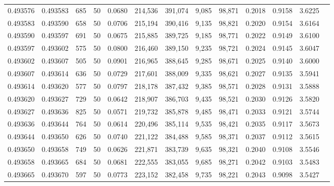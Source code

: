 \begin{tabular}{rrrrrrrrrrrrr}
0.493576 & 0.493583 &   685 &  50 &                                     0.0680 & 214,536 & 391,074 &   9,085 &  98,871 & 0.2018 & 0.9158 & 3.6225 \\
0.493583 & 0.493590 &   658 &  50 &                                     0.0706 & 215,194 & 390,416 &   9,135 &  98,821 & 0.2020 & 0.9154 & 3.6164 \\
0.493590 & 0.493597 &   691 &  50 &                                     0.0675 & 215,885 & 389,725 &   9,185 &  98,771 & 0.2022 & 0.9149 & 3.6100 \\
0.493597 & 0.493602 &   575 &  50 &                                     0.0800 & 216,460 & 389,150 &   9,235 &  98,721 & 0.2024 & 0.9145 & 3.6047 \\
0.493602 & 0.493607 &   505 &  50 &                                     0.0901 & 216,965 & 388,645 &   9,285 &  98,671 & 0.2025 & 0.9140 & 3.6000 \\
0.493607 & 0.493614 &   636 &  50 &                                     0.0729 & 217,601 & 388,009 &   9,335 &  98,621 & 0.2027 & 0.9135 & 3.5941 \\
0.493614 & 0.493620 &   577 &  50 &                                     0.0797 & 218,178 & 387,432 &   9,385 &  98,571 & 0.2028 & 0.9131 & 3.5888 \\
0.493620 & 0.493627 &   729 &  50 &                                     0.0642 & 218,907 & 386,703 &   9,435 &  98,521 & 0.2030 & 0.9126 & 3.5820 \\
0.493627 & 0.493636 &   825 &  50 &                                     0.0571 & 219,732 & 385,878 &   9,485 &  98,471 & 0.2033 & 0.9121 & 3.5744 \\
0.493636 & 0.493644 &   764 &  50 &                                     0.0614 & 220,496 & 385,114 &   9,535 &  98,421 & 0.2035 & 0.9117 & 3.5673 \\
0.493644 & 0.493650 &   626 &  50 &                                     0.0740 & 221,122 & 384,488 &   9,585 &  98,371 & 0.2037 & 0.9112 & 3.5615 \\
0.493650 & 0.493658 &   749 &  50 &                                     0.0626 & 221,871 & 383,739 &   9,635 &  98,321 & 0.2040 & 0.9108 & 3.5546 \\
0.493658 & 0.493665 &   684 &  50 &                                     0.0681 & 222,555 & 383,055 &   9,685 &  98,271 & 0.2042 & 0.9103 & 3.5483 \\
0.493665 & 0.493670 &   597 &  50 &                                     0.0773 & 223,152 & 382,458 &   9,735 &  98,221 & 0.2043 & 0.9098 & 3.5427 \\

\end{tabular}
